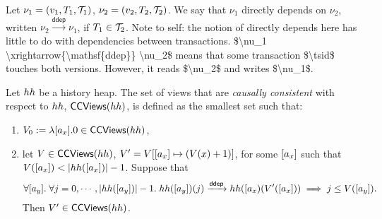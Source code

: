 \begin{definition}
Let $\nu_1 = (v_1, T_1, \mathcal{T}_1)$, $\nu_2 = (v_2, T_2, \mathcal{T}_2)$. 
We say that $\nu_1$ directly depends on $\nu_2$, written $\nu_2 \xrightarrow{\mathsf{ddep}} \nu_1$, 
 if $T_1 \in \mathcal{T}_2$. 
\ac{Note to self: the notion of directly depends here has little to do with dependencies 
between transactions. $\nu_1 \xrightarrow{\mathsf{ddep}} \nu_2$ means that 
some transaction $\tsid$ touches both versions. However, it reads $\nu_2$ and 
writes $\nu_1$.}

Let $hh$ be a history heap. The set of views that are \emph{causally consistent} 
with respect to $hh$, $\mathsf{CCViews}(hh)$, is defined as the smallest set such that: 
\begin{enumerate} 
\item $V_0 := \lambda [a_x].0 \in \mathsf{CCViews}(hh)$, 
\item let $V \in \mathsf{CCViews}(hh)$, $V' = V[[a_x] \mapsto (V(x) + 1)]$, 
for some $[a_x]$ such that $V([a_x]) < \lvert hh([a_x]) \rvert - 1$.
Suppose that 
\[
\forall [a_y].\;\forall j = 0,\cdots, \lvert hh([a_y]) \rvert -1.\; 
hh([a_y])(j) \xrightarrow{\mathsf{ddep}} hh([a_{x})(V'([a_x])) 
\implies j \leq V([a_y]).
\]
Then $V' \in \mathsf{CCViews}(hh)$.
\end{enumerate}
\end{definition}

